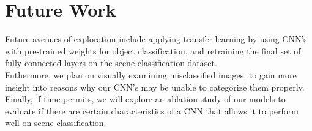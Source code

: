 \documentclass[10pt,twocolumn,letterpaper]{article}
\begin{document}
\section{Future Work}

Future avenues of exploration include applying transfer learning by using
CNN's with pre-trained weights for object classification, and retraining the
final set of fully connected layers on the scene classification dataset.\\

Futhermore, we plan on visually examining misclassified images, to
gain more insight into reasons why our CNN's may be unable to categorize them properly.\\

Finally, if time permits, we will explore an ablation study of our models to
evaluate if there are certain characteristics of a CNN that allows it to perform
well on scene classification.\\


\nocite{Lin}
\nocite{Wu}


{\small


}
\end{document}
